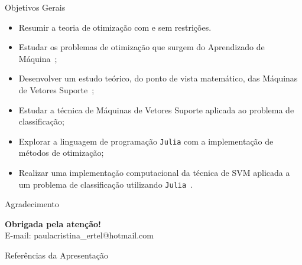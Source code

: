 \documentclass{beamer}
\theoremstyle{definition}%
\begin{document}
\begin{frame}{Objetivos Gerais}
\begin{block}{}
\begin{itemize}
	\item Resumir a teoria de otimização com e sem restrições.

	\item Estudar os problemas de otimização que surgem do Aprendizado de Máquina~\cite{Ana1994,Ademir2013};

	\item Desenvolver um estudo teórico, do ponto de vista matemático, das Máquinas de Vetores Suporte~\cite{Faisal2019,Evelin2017};

	\item Estudar a técnica de Máquinas de Vetores Suporte aplicada ao problema de classificação; 

	\item Explorar a linguagem de programação \texttt{Julia} com a implementação de métodos de otimização;

	\item Realizar uma implementação computacional da técnica de SVM aplicada a um problema de classificação utilizando \texttt{Julia}~\cite{Bezanson:2017g}.
\end{itemize}
\end{block}
\end{frame}


%


\begin{frame}{Agradecimento}

\begin{block}{}

\centering
\Large{\textbf{Obrigada pela atenção!}}
$$$$
{\normalsize E-mail: paulacristina\_ertel@hotmail.com }

\end{block}
\end{frame}


\begin{frame}{Referências da Apresentação}
\printbibliography
\end{frame}
\end{document}
